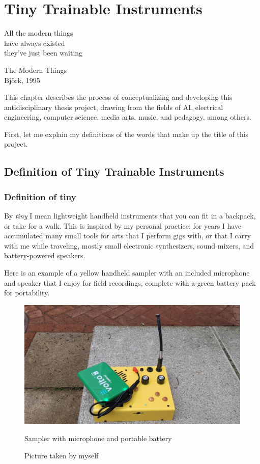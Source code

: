 \chapter{Tiny Trainable Instruments}

\epigraph{All the modern things \\ have always existed \\ they've just been waiting}{The Modern Things \\ Björk, 1995}

This chapter describes the process of conceptualizing and developing this antidisciplinary thesis project, drawing from the fields of \acrlong{AI}, electrical engineering, computer science, media arts, music, and pedagogy, among others.

First, let me explain my definitions of the words that make up the title of this project.

\section{Definition of Tiny Trainable Instruments}

\subsection{Definition of tiny}

By \emph{tiny} I mean lightweight handheld instruments that you can fit in a backpack, or take for a walk. This is inspired by my personal practice: for years I have accumulated many small tools for arts that I perform gigs with, or that I carry with me while traveling, mostly small electronic synthesizers, sound mixers, and battery-powered speakers.

Here is an example of a yellow handheld sampler with an included microphone and speaker that I enjoy for field recordings, complete with a green battery pack for portability.

\begin{figure}[ht]
  \centering
  \includegraphics[width=0.75\linewidth,height=0.25\textheight,keepaspectratio]{images/critter-and-guitari-kaleidoloop-battery.jpg}
  \caption{Sampler with microphone and portable battery}
  \caption*{Picture taken by myself}
  \label{fig:critter-and-guitari-kaleidoloop-battery}
\end{figure}

